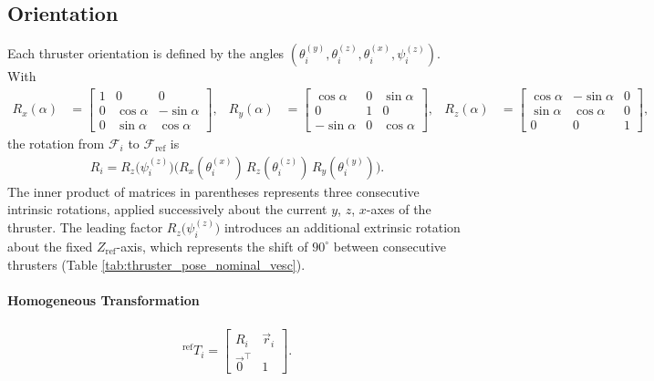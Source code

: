 \subsection*{Orientation}
Each thruster orientation is defined by the angles
$(\theta_i^{(y)}, \theta_i^{(z)}, \theta_i^{(x)}, \psi_i^{(z)})$.
With
\begin{align}
R_x(\alpha)&=\begin{bmatrix}1&0&0\\0&\cos\alpha&-\sin\alpha\\0&\sin\alpha&\cos\alpha\end{bmatrix}, &
R_y(\alpha)&=\begin{bmatrix}\cos\alpha&0&\sin\alpha\\0&1&0\\-\sin\alpha&0&\cos\alpha\end{bmatrix}, &
R_z(\alpha)&=\begin{bmatrix}\cos\alpha&-\sin\alpha&0\\\sin\alpha&\cos\alpha&0\\0&0&1\end{bmatrix},
\end{align}
the rotation from $\mathcal{F}_i$ to $\mathcal{F}_{\mathrm{ref}}$ is
\begin{align}
R_i = R_z\!\bigl(\psi_i^{(z)}\bigr)
       \bigl(R_x(\theta_i^{(x)})\,R_z(\theta_i^{(z)})\,R_y(\theta_i^{(y)})\bigr).
\end{align}
The inner product of matrices in parentheses represents three consecutive intrinsic rotations, applied successively about the current $y$, $z$, $x$-axes of the thruster. The leading factor $R_z\!\bigl(\psi_i^{(z)}\bigr)$ introduces an additional extrinsic rotation about the fixed $Z_{\mathrm{ref}}$-axis, which represents the shift of $90^\circ$ between consecutive thrusters (Table \ref{tab:thruster_pose_nominal_vesc}).

\paragraph{Homogeneous Transformation} 
\begin{align}
{}^{\mathrm{ref}}T_i =
\begin{bmatrix}
R_i & \vec{r}_i\\
\vec{0}^\top & 1
\end{bmatrix}.
\end{align}

